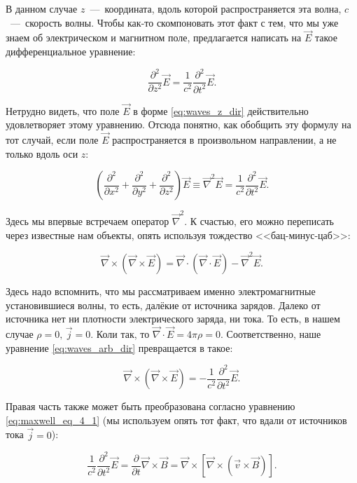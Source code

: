 \documentclass[a4paper,12pt]{article}
\numberwithin{equation}{section}
\newcommand{\pt}{\partial}
\newcommand{\vn}{\vec{\nabla}}
\begin{document}
В данном случае $z$~---~координата, вдоль которой распространяется эта
волна, $c$~---~скорость волны. Чтобы как-то скомпоновать этот факт с
тем, что мы уже знаем об электрическом и магнитном поле, предлагается
написать на $\vec{E}$ такое дифференциальное уравнение: 

\begin{equation}
  \label{eq:waves_diff_eq}
  \frac{\pt^2}{\pt z^2} \vec{E} = \frac{1}{c^2} \frac{\pt^2}{\pt t^2} \vec{E}.
\end{equation}

Нетрудно видеть, что поле $\vec{E}$ в форме \eqref{eq:waves_z_dir}
действительно удовлетворяет этому уравнению. Отсюда понятно, как
обобщить эту формулу на тот случай, если поле $\vec{E}$
распространяется в произвольном направлении, а не только вдоль оси
$z$: 

\begin{equation}
  \label{eq:waves_arb_dir}
   \left( \frac{\pt^2}{\pt x^2} + \frac{\pt^2}{\pt y^2} + \frac{\pt^2}{\pt
     z^2} \right) \vec{E} \equiv \vn^2 \vec{E} = \frac{1}{c^2} \frac{\pt^2}{\pt t^2} \vec{E}.
\end{equation}

Здесь мы впервые встречаем оператор $\vn^2$. К счастью, его можно
переписать через известные нам объекты, опять используя тождество
<<бац-минус-цаб>>: 

\begin{equation}
  \label{eq:bac_cab_2}
  \vn \times \left( \vn \times \vec{E}  \right) = \vn \cdot \left( \vn
  \cdot \vec{E} \right) - \vn^2 \vec{E}.
\end{equation}

Здесь надо вспомнить, что мы рассматриваем именно электромагнитные
установившиеся волны, то есть, далёкие от источника зарядов. Далеко от
источника нет ни плотности электрического заряда, ни тока. То есть, в
нашем случае $\rho=0, \, \vec{j}=0$. Коли так, то $\vn \cdot \vec{E}
= 4 \pi \rho=0$. Соответственно, наше уравнение
\eqref{eq:waves_arb_dir} превращается в такое: 

\begin{equation}
  \label{eq:waves_eq_2}
  \vn \times \left( \vn \times \vec{E}  \right) = - \frac{1}{c^2} \frac{\pt^2}{\pt t^2} \vec{E}.
\end{equation}

Правая часть также может быть преобразована согласно уравнению
\eqref{eq:maxwell_eq_4_1} (мы используем опять тот факт, что вдали
от источников тока $\vec{j}=0$):

\begin{equation}
  \label{eq:waves_eq_3}
  \frac{1}{c^2} \frac{\pt^2}{\pt t^2} \vec{E} =
  \frac{\pt}{\pt t} \vn \times \vec{B} =  \vn \times \left[
  \vn \times \left( \vec{v} \times \vec{B}  \right)\right].
\end{equation}
\end{document}
